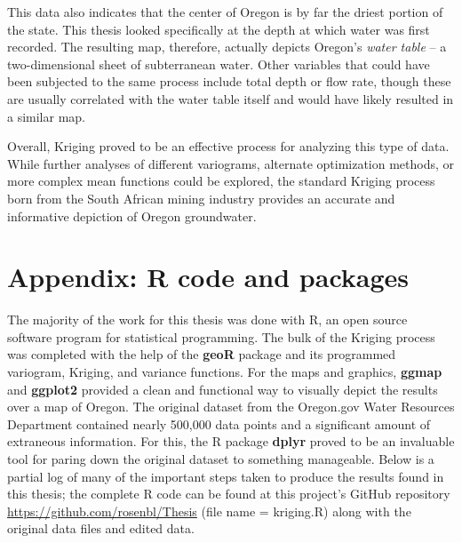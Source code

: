 \documentclass[12pt,twoside]{reedthesis}
\begin{document}
This data also indicates that the center of Oregon is by far the driest portion of the state. This thesis looked specifically at the depth at which water was first recorded. The resulting map, therefore, actually depicts Oregon's \emph{water table} -- a two-dimensional sheet of subterranean water. Other variables that could have been subjected to the same process include total depth or flow rate, though these are usually correlated with the water table itself and would have likely resulted in a similar map. 

Overall, Kriging proved to be an effective process for analyzing this type of data. While further analyses of different variograms, alternate optimization methods, or more complex mean functions could be explored, the standard Kriging process born from the South African mining industry provides an accurate and informative depiction of Oregon groundwater.


    \appendix
      
     \chapter*{Appendix: R code and packages}


The majority of the work for this thesis was done with R, an open source software program for statistical programming. The bulk of the Kriging process was completed with the help of the \textbf{geoR} package \cite{geoR} and its programmed variogram, Kriging, and variance functions. For the maps and graphics, \textbf{ggmap} \cite{ggmap} and \textbf{ggplot2} \cite{ggplot2} provided a clean and functional way to visually depict the results over a map of Oregon. The original dataset from the Oregon.gov Water Resources Department contained nearly 500,000 data points and a significant amount of extraneous information. For this, the R package \textbf{dplyr} \cite{dplyr} proved to be an invaluable tool for paring down the original dataset to something manageable. Below is a partial log of many of the important steps taken to produce the results found in this thesis; the complete R code can be found at this project's GitHub repository \url{https://github.com/rosenbl/Thesis} (file name = kriging.R) along with the original data files and edited data. \\
\end{document}
